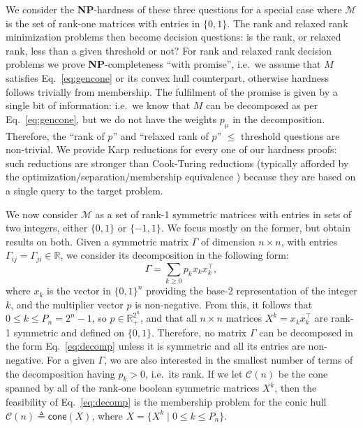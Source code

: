 \documentclass[envcountsect,envcountsame]{svjour3}
\theoremstyle{changebreak}                %
\newcommand{\transpose}[1]{{#1}^{\top}}
\newcommand{\cone}[1]{\mathsf{cone}(#1)}
\newcommand{\CONX}[1]{\mathcal{C}(#1)}
\begin{document}
We consider the \textbf{NP}-hardness of these three questions for a special case where $\mathcal{M}$ is the set of rank-one matrices with entries in $\{0,1\}$. The rank and relaxed rank minimization problems then become decision questions: is the rank, or relaxed rank, less than a given threshold or not? For rank and relaxed rank decision problems we prove \textbf{NP}-completeness ``with promise'', i.e.~we assume that $M$ satisfies Eq.~\eqref{eq:gencone} or its convex hull counterpart, otherwise hardness follows trivially from membership. The fulfilment of the promise is given by a single bit of information: i.e.~we know that $M$ can be decomposed as per Eq.~\eqref{eq:gencone}, but we do not have the weights $p_\mu$ in the decomposition. Therefore, the ``rank of $p$'' and ``relaxed rank of $p$'' $\le$ threshold questions are non-trivial. We provide Karp reductions for every one of our hardness proofs: such reductions are stronger than Cook-Turing reductions (typically afforded by the optimization/separation/membership equivalence \cite{gls}) because they are based on a single query to the target problem. 

We now consider $\mathcal{M}$ as a set of rank-1 symmetric matrices with entries in sets of two integers, either $\{0,1\}$ or $\{-1,1\}$. We focus mostly on the former, but obtain results on both. Given a symmetric matrix $\Gamma$ of dimension $n\times n$, with entries $\Gamma_{ij}=\Gamma_{ji}\in\mathbb{R}$, we consider its decomposition in the following form:
\begin{equation}
  \Gamma = \sum\limits_{k\ge 0} p_k x_k\transpose{x}_k,
  \label{eq:decomp}
\end{equation}
where $x_k$ is the vector in $\{0,1\}^n$ providing the base-2 representation of the integer $k$, and the multiplier vector $p$ is non-negative. From this, it follows that $0\le k\le P_n=2^n-1$, so $p\in\mathbb{R}^{2^n}_+$, and that all $n\times n$ matrices $X^k=x_k\transpose{x}_k$ are rank-1 symmetric and defined on $\{0,1\}$. Therefore, no matrix $\Gamma$ can be decomposed in the form Eq.~\eqref{eq:decomp} unless it is symmetric and all its entries are non-negative. For a given $\Gamma$, we are also interested in the smallest number of terms of the decomposition having $p_k>0$, i.e.~its rank. If we let $\CONX{n}$ be the cone spanned by all of the rank-one boolean symmetric matrices $X^k$, then the feasibility of Eq.~\eqref{eq:decomp} is the membership problem for the conic hull $\CONX{n} \triangleq \cone{X}$, where $X=\{X^k\;|\;0\le k\le P_n\}$.
\end{document}
